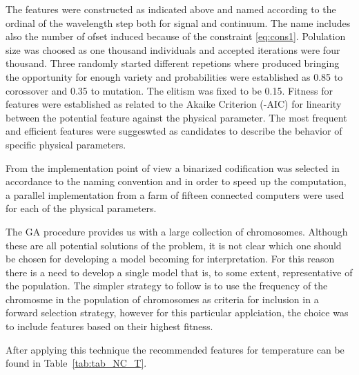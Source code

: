 {{{{The features were constructed as indicated above and named according
to the ordinal of the wavelength step both for signal and
continuum. The name includes also the number of ofset induced because
of the constraint \ref{eq:cons1}.  Polulation size was choosed as one
thousand individuals and accepted iterations were four thousand.
Three randomly started different repetions where produced bringing the
opportunity for enough variety and probabilities were established as
0.85 to corossover and 0.35 to mutation. The elitism was fixed to be
0.15.  Fitness for features were established as related to the Akaike
Criterion (-AIC) for linearity between the potential feature against
the physical parameter.  The most frequent and efficient features were
suggeswted as candidates to describe the behavior of specific physical
parameters.

From the implementation point of view a binarized codification was
selected in accordance to the naming convention and in order to speed
up the computation, a parallel implementation from a farm of fifteen
connected computers were used for each of the physical parameters.  }


{ The GA procedure provides us with a large collection of chromosomes.
  Although these are all potential solutions of the problem, it is not
  clear which one should be chosen for developing a model becoming for
  interpretation.  For this reason there is a need to develop a single
  model that is, to some extent, representative of the population. The
  simpler strategy to follow is to use the frequency of the chromosme
  in the population of chromosomes as criteria for inclusion in a
  forward selection strategy, however for this particular applciation,
  the choice was to include features based on their highest fitness.

After applying this technique the recommended features for temperature 
can be found in Table~\ref{tab:tab_NC_T}. 

}}}}
